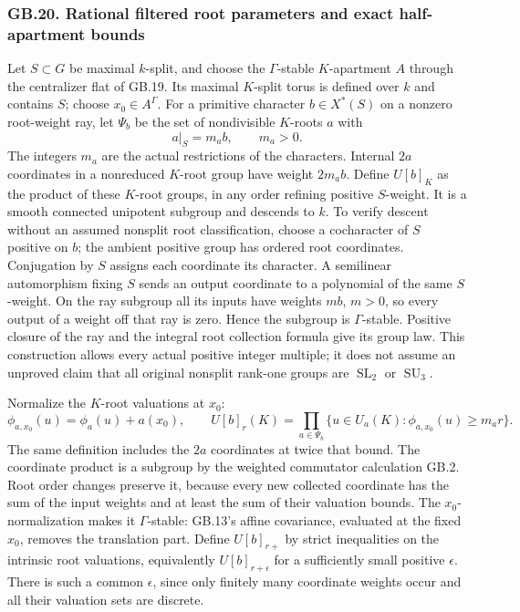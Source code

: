 \documentclass[
  11pt,
]{article}
\begin{document}
\subsubsection{GB.20. Rational filtered root parameters and exact
half-apartment
bounds}\label{gb.20.-rational-filtered-root-parameters-and-exact-half-apartment-bounds}

Let \(S\subset G\) be maximal \(k\)-split, and choose the
\(\Gamma\)-stable \(K\)-apartment \(A\) through the centralizer flat of
GB.19. Its maximal \(K\)-split torus is defined over \(k\) and contains
\(S\); choose \(x_0\in A^\Gamma\). For a primitive character
\(b\in X^*(S)\) on a nonzero root-weight ray, let \(\Psi_b\) be the set
of nondivisible \(K\)-roots \(a\) with \[
                              a|_S=m_a b,\qquad m_a>0 .
\] The integers \(m_a\) are the actual restrictions of the characters.
Internal \(2a\) coordinates in a nonreduced \(K\)-root group have weight
\(2m_ab\). Define \(U[b]_K\) as the product of these \(K\)-root groups,
in any order refining positive \(S\)-weight. It is a smooth connected
unipotent subgroup and descends to \(k\). To verify descent without an
assumed nonsplit root classification, choose a cocharacter of \(S\)
positive on \(b\); the ambient positive group has ordered root
coordinates. Conjugation by \(S\) assigns each coordinate its character.
A semilinear automorphism fixing \(S\) sends an output coordinate to a
polynomial of the same \(S\)-weight. On the ray subgroup all its inputs
have weights \(m b\), \(m>0\), so every output of a weight off that ray
is zero. Hence the subgroup is \(\Gamma\)-stable. Positive closure of
the ray and the integral root collection formula give its group law.
This construction allows every actual positive integer multiple; it does
not assume an unproved claim that all original nonsplit rank-one groups
are \(\operatorname{SL}_2\) or \(\operatorname{SU}_3\).

Normalize the \(K\)-root valuations at \(x_0\): \[
 \phi_{a,x_0}(u)=\phi_a(u)+a(x_0),\qquad
 U[b]_r(K)=
      \prod_{a\in\Psi_b}\{u\in U_a(K):
                         \phi_{a,x_0}(u)\geq m_a r\}.        \tag{GB20.1}
\] The same definition includes the \(2a\) coordinates at twice that
bound. The coordinate product is a subgroup by the weighted commutator
calculation GB.2. Root order changes preserve it, because every new
collected coordinate has the sum of the input weights and at least the
sum of their valuation bounds. The \(x_0\)-normalization makes it
\(\Gamma\)-stable: GB.13's affine covariance, evaluated at the fixed
\(x_0\), removes the translation part. Define \(U[b]_{r+}\) by strict
inequalities on the intrinsic root valuations, equivalently
\(U[b]_{r+\epsilon}\) for a sufficiently small positive \(\epsilon\).
There is such a common \(\epsilon\), since only finitely many coordinate
weights occur and all their valuation sets are discrete.
\end{document}
